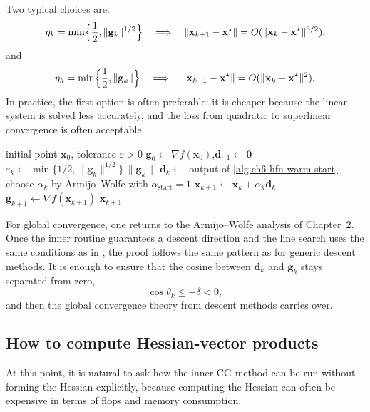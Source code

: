 Two typical choices are:
\[
  \eta_k=\min\Bigl\{\frac12,\|\mathbf{g}_k\|^{1/2}\Bigr\}
  \quad\Longrightarrow\quad
  \|\mathbf{x}_{k+1}-\mathbf{x}^\star\|
  =O(\|\mathbf{x}_k-\mathbf{x}^\star\|^{3/2}),
\]
and
\[
  \eta_k=\min\Bigl\{\frac12,\|\mathbf{g}_k\|\Bigr\}
  \quad\Longrightarrow\quad
  \|\mathbf{x}_{k+1}-\mathbf{x}^\star\|
  =O(\|\mathbf{x}_k-\mathbf{x}^\star\|^{2}).
\]
In practice, the first option is often preferable: it is
cheaper because the linear system is solved less accurately, and the loss from
quadratic to superlinear convergence is often acceptable.

\begin{algorithm}[ht]
  \caption{A Hessian-free Newton scheme}
  \label{alg:ch6-hfn}
  \begin{algorithmic}
    \REQUIRE initial point $\mathbf{x}_0$, tolerance $\varepsilon>0$
    \STATE $\mathbf{g}_0\gets \nabla f(\mathbf{x}_0)$,\quad $\mathbf{d}_{-1}\gets \mathbf{0}$
      \STATE $\varepsilon_k\gets \min\{1/2,\|\mathbf{g}_k\|^{1/2}\}\,\|\mathbf{g}_k\|$
      \STATE $\mathbf{d}_k\gets$ output of \cref{alg:ch6-hfn-warm-start}
      \STATE choose $\alpha_k$ by Armijo--Wolfe with $\alpha_{\mathrm{start}}=1$
      \STATE $\mathbf{x}_{k+1}\gets \mathbf{x}_k+\alpha_k\mathbf{d}_k$
      \STATE $\mathbf{g}_{k+1}\gets \nabla f(\mathbf{x}_{k+1})$
        \RETURN $\mathbf{x}_{k+1}$
      \ENDIF
    \ENDFOR
  \end{algorithmic}
\end{algorithm}

For global convergence, one returns to the Armijo--Wolfe analysis of
Chapter~2.
Once the inner routine guarantees a descent direction and the line search uses
the same conditions as in , the proof follows the
same pattern as for generic descent methods. It is enough to
ensure that the cosine between $\mathbf{d}_k$ and $\mathbf{g}_k$ stays
separated from zero,
\[
  \cos \theta_k\le -\delta<0,
\]
and then the global convergence theory from descent methods carries over.

\subsection{How to compute Hessian-vector products}
\label{sec:ch6-hv-products}
At this point, it is natural to ask how the inner CG method can be run without forming
the Hessian explicitly, because computing the Hessian can often be expensive in terms of
flops and memory consumption.

